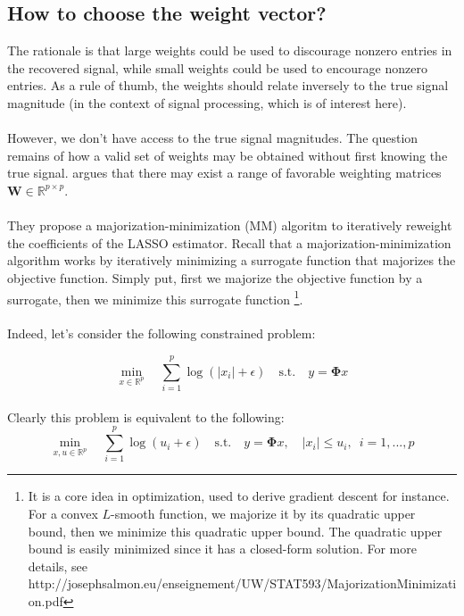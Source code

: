 \documentclass[a4paper,10pt]{article}
\theoremstyle{definition}
\begin{document}
\subsection*{How to choose the weight vector?}

The rationale is that large weights could be used to discourage nonzero entries in the recovered signal, while small weights could be used to encourage nonzero entries. As a rule of thumb, the weights should relate inversely
to the true signal magnitude (in the context of signal processing, which is of interest here).
\\
\\
However, we don't have access to the true signal magnitudes. The question remains of how a valid set of weights may be obtained without first knowing the true signal. \cite{Candes_Wakin_Boyd08} argues that there may exist a range of
favorable weighting matrices $\mathbf{W} \in \mathbb{R}^{p \times p}$.
\\
\\
They propose a majorization-minimization (MM) algoritm to iteratively reweight the coefficients of the LASSO estimator. Recall that a majorization-minimization algorithm works by iteratively minimizing a surrogate function that majorizes the
objective function. Simply put, first we majorize the objective function by a surrogate, then we minimize this surrogate function \footnote{It is a core idea in optimization, used to derive gradient descent for instance. For a convex $L$-smooth function,
we majorize it by its quadratic upper bound, then we minimize this quadratic upper bound. The quadratic upper bound is easily minimized since it has a closed-form solution. For more details, see http://josephsalmon.eu/enseignement/UW/STAT593/MajorizationMinimization.pdf}.
\\
\\
Indeed, let's consider the following constrained problem:

\begin{equation*}
    \min_{x \in \mathbb{R}^p} \quad  \sum_{i=1}^p \log(\lvert x_i \rvert + \epsilon) \quad \textrm{s.t.} \quad  y = \mathbf{\Phi} x
\end{equation*}
\\

Clearly this problem is equivalent to the following:
\begin{equation*}
    \min_{x,u \in \mathbb{R}^p} \quad  \sum_{i=1}^p \log(u_i + \epsilon) \quad \textrm{s.t.} \quad  y = \mathbf{\Phi} x, \quad \lvert x_i \rvert \leq u_i, \enspace i=1,...,p
\end{equation*}
\end{document}
